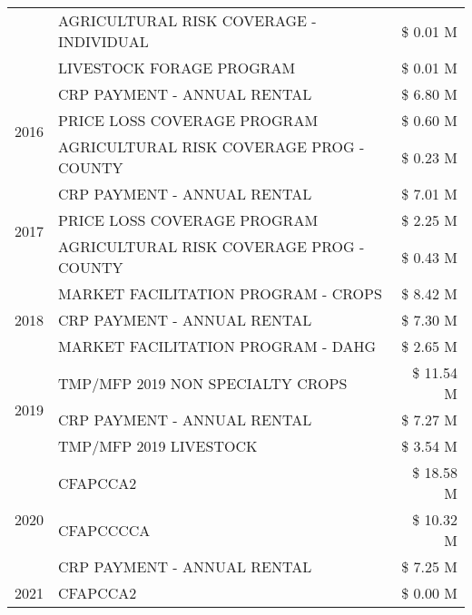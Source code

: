 \begin{tabular}{llr}
 & AGRICULTURAL RISK COVERAGE - INDIVIDUAL & \$ 0.01 M \\
 & LIVESTOCK FORAGE PROGRAM & \$ 0.01 M \\
\cline{1-3}
\multirow[t]{3}{*}{2016} & CRP PAYMENT - ANNUAL RENTAL & \$ 6.80 M \\
 & PRICE LOSS COVERAGE PROGRAM & \$ 0.60 M \\
 & AGRICULTURAL RISK COVERAGE PROG - COUNTY & \$ 0.23 M \\
\cline{1-3}
\multirow[t]{3}{*}{2017} & CRP PAYMENT - ANNUAL RENTAL & \$ 7.01 M \\
 & PRICE LOSS COVERAGE PROGRAM & \$ 2.25 M \\
 & AGRICULTURAL RISK COVERAGE PROG - COUNTY & \$ 0.43 M \\
\cline{1-3}
\multirow[t]{3}{*}{2018} & MARKET FACILITATION PROGRAM - CROPS & \$ 8.42 M \\
 & CRP PAYMENT - ANNUAL RENTAL & \$ 7.30 M \\
 & MARKET FACILITATION PROGRAM - DAHG & \$ 2.65 M \\
\cline{1-3}
\multirow[t]{3}{*}{2019} & TMP/MFP 2019 NON SPECIALTY CROPS & \$ 11.54 M \\
 & CRP PAYMENT - ANNUAL RENTAL & \$ 7.27 M \\
 & TMP/MFP 2019 LIVESTOCK & \$ 3.54 M \\
\cline{1-3}
\multirow[t]{3}{*}{2020} & CFAPCCA2 & \$ 18.58 M \\
 & CFAPCCCCA & \$ 10.32 M \\
 & CRP PAYMENT - ANNUAL RENTAL & \$ 7.25 M \\
\cline{1-3}
2021 & CFAPCCA2 & \$ 0.00 M \\
\cline{1-3}
\bottomrule
\end{tabular}
